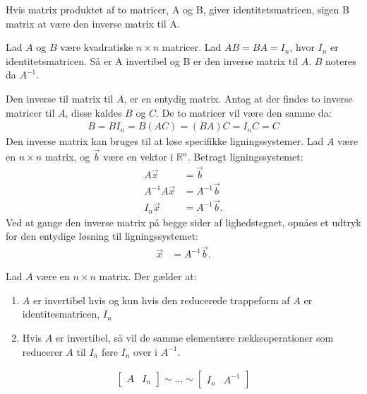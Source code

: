 Hvis matrix produktet af to matricer, A og B, giver identitetsmatricen, sigen B matrix at være den inverse matrix til A. 
\begin{defn}
Lad $A$ og $B$ være kvadratiske $n \times n$ matricer. Lad $AB=BA=I_n$, hvor $I_n$ er identitetsmatricen. Så er A invertibel og B er den inverse matrix til $A$. $B$ noteres da $A^{-1}$. 
\label{def(inversmatrix)}
\end{defn}
Den inverse til matrix til $A$, er en entydig matrix. Antag at der findes to inverse matricer til $A$, disse kaldes $B$ og $C$. De to matricer vil være den samme da: 
\begin{align*}
B=BI_n=B(AC)=(BA)C=I_nC=C
\end{align*}
Den inverse matrix kan bruges til at løse specifikke ligningssystemer. Lad $A$ være en $n \times n$ matrix, og $\vec{b}$ være en vektor i $\mathds{R}^n$. Betragt ligningssystemet: 
\begin{align*}
A \vec{x} &= \vec{b}\\
A^{-1} A \vec{x} &= A^{-1} \vec{b}\\
I_n \vec{x} &= A^{-1} \vec{b}.
\end{align*} 
Ved at gange den inverse matrix på begge sider af lighedstegnet, opnåes et udtryk for den entydige løsning til ligningssystemet: 
\begin{align}
\vec{x} &= A^{-1} \vec{b}.
\end{align} 

\begin{stn}
Lad $A$ være en $n \times n$ matrix. Der gælder at: 
\begin{enumerate}[label=(\alph*)]
\item $A$ er invertibel hvis og kun hvis den reducerede trappeform af $A$ er identitesmatricen, $I_n$
\item Hvis $A$ er invertibel, så vil de samme elementære rækkeoperationer som reducerer $A$ til $I_n$ føre $I_n$ over i $A^{-1}$.  
\end{enumerate}
\begin{align*}
\begin{bmatrix}
A & I_n
\end{bmatrix} \sim \dots \sim
\begin{bmatrix}
I_n & A^{-1}
\end{bmatrix}
\end{align*}
\label{stn:inversmatrix}
\end{stn}

